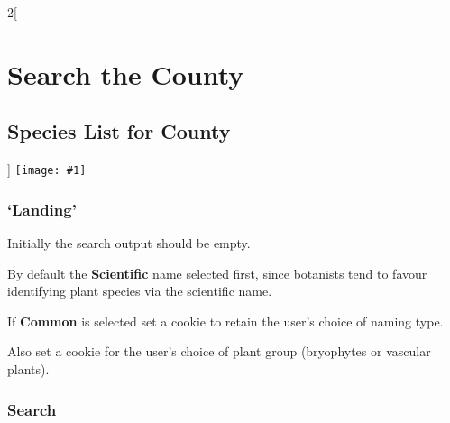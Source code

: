 \documentclass[a4paper,12pt,landscape]{article}
\newcommand{\wireframe}[1]{\texttt{[image: \#1]}\clearpage}
\begin{document}
\begin{multicols*}{2}[%
  \section{Search the County}%
  \subsection{Species List for County}%
]
\thispagestyle{empty}
\wireframe{./wireframes/Species__ListForCounty.png}%

\subsubsection*{`Landing'} 

\begin{todolist}
  \item Initially the search output should be empty.
  \item By default the \textbf{Scientific} name selected first,
  since botanists tend to favour identifying
  plant species via the scientific name.
  \item If \textbf{Common} is selected set a cookie to retain the user's choice of naming type.
  \item Also set a cookie for the user's choice of plant group (bryophytes or vascular plants).
\end{todolist}

\subsubsection*{Search}


\end{multicols*}
\end{document}
